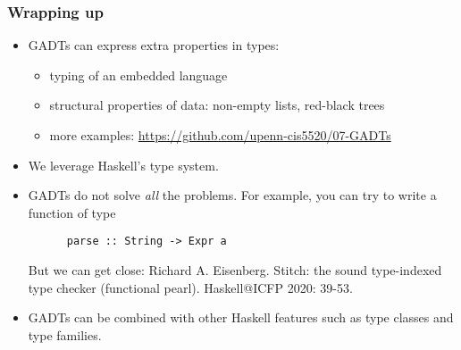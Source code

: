 \documentclass[pdftex,aspectratio=169]{beamer}
\begin{document}
\begin{frame}[fragile]
  \frametitle{Wrapping up}
  \begin{itemize}[<+->]
  \item GADTs can express extra properties in types:
    \begin{itemize}
    \item typing of an embedded language
    \item structural properties of data: non-empty lists, red-black
      trees
    \item more examples: \url{https://github.com/upenn-cis5520/07-GADTs}
    \end{itemize}
  \item We leverage Haskell's type system.
  \item GADTs do not solve \emph{all} the problems.
    For example, you can try to write a function of type
    \begin{lstlisting}
      parse :: String -> Expr a
    \end{lstlisting}
    \pause
    But we can get close:
    Richard A. Eisenberg.
    Stitch: the sound type-indexed type checker (functional
    pearl). Haskell@ICFP 2020: 39-53.
  \item 
    GADTs can be combined with other Haskell features such as type
    classes and type families. 
  \end{itemize}
\end{frame}
\end{document}
